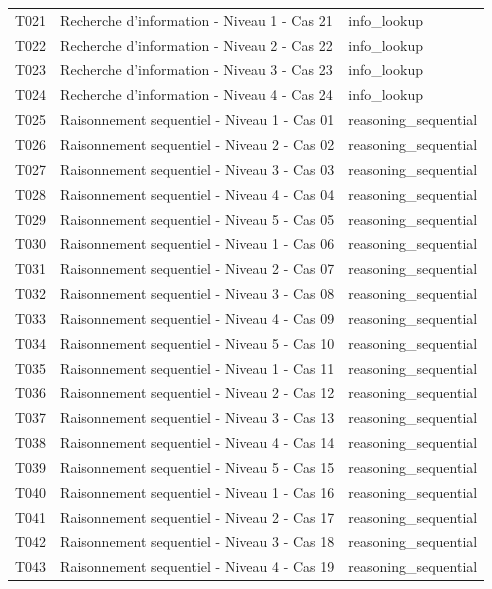 \begin{longtable}{@{}lll@{}}
T021 & Recherche d'information - Niveau 1 - Cas 21 & info\_lookup \\
T022 & Recherche d'information - Niveau 2 - Cas 22 & info\_lookup \\
T023 & Recherche d'information - Niveau 3 - Cas 23 & info\_lookup \\
T024 & Recherche d'information - Niveau 4 - Cas 24 & info\_lookup \\
T025 & Raisonnement sequentiel - Niveau 1 - Cas 01 & reasoning\_sequential \\
T026 & Raisonnement sequentiel - Niveau 2 - Cas 02 & reasoning\_sequential \\
T027 & Raisonnement sequentiel - Niveau 3 - Cas 03 & reasoning\_sequential \\
T028 & Raisonnement sequentiel - Niveau 4 - Cas 04 & reasoning\_sequential \\
T029 & Raisonnement sequentiel - Niveau 5 - Cas 05 & reasoning\_sequential \\
T030 & Raisonnement sequentiel - Niveau 1 - Cas 06 & reasoning\_sequential \\
T031 & Raisonnement sequentiel - Niveau 2 - Cas 07 & reasoning\_sequential \\
T032 & Raisonnement sequentiel - Niveau 3 - Cas 08 & reasoning\_sequential \\
T033 & Raisonnement sequentiel - Niveau 4 - Cas 09 & reasoning\_sequential \\
T034 & Raisonnement sequentiel - Niveau 5 - Cas 10 & reasoning\_sequential \\
T035 & Raisonnement sequentiel - Niveau 1 - Cas 11 & reasoning\_sequential \\
T036 & Raisonnement sequentiel - Niveau 2 - Cas 12 & reasoning\_sequential \\
T037 & Raisonnement sequentiel - Niveau 3 - Cas 13 & reasoning\_sequential \\
T038 & Raisonnement sequentiel - Niveau 4 - Cas 14 & reasoning\_sequential \\
T039 & Raisonnement sequentiel - Niveau 5 - Cas 15 & reasoning\_sequential \\
T040 & Raisonnement sequentiel - Niveau 1 - Cas 16 & reasoning\_sequential \\
T041 & Raisonnement sequentiel - Niveau 2 - Cas 17 & reasoning\_sequential \\
T042 & Raisonnement sequentiel - Niveau 3 - Cas 18 & reasoning\_sequential \\
T043 & Raisonnement sequentiel - Niveau 4 - Cas 19 & reasoning\_sequential \\

\end{longtable}
